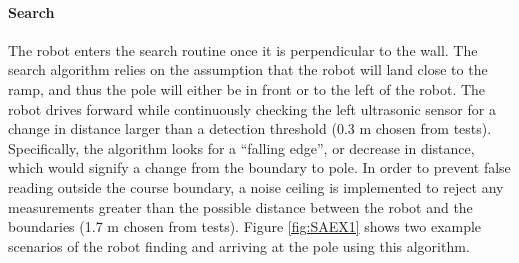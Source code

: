 \documentclass[ece]{uw-wkrpt}
\begin{document}
\paragraph{Search}

The robot enters the search routine once it is perpendicular to the wall. The search algorithm relies on the assumption that the robot will land close to the ramp, and thus the pole will either be in front or to the left of the robot. The robot drives forward while continuously checking the left ultrasonic sensor for a change in distance larger than a detection threshold (0.3 m chosen from tests). Specifically, the algorithm looks for a “falling edge”, or decrease in distance, which would signify a change from the boundary to pole. In order to prevent false reading outside the course boundary, a noise ceiling is implemented to reject any measurements greater than the possible distance between the robot and the boundaries (1.7 m chosen from tests). Figure \ref{fig:SAEX1} shows two example scenarios of the robot finding and arriving at the pole using this algorithm.
\end{document}

